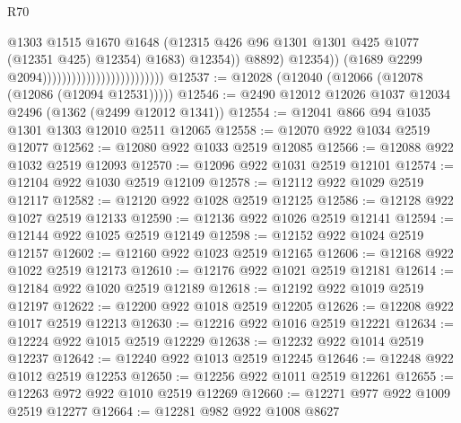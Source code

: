 \begin{lexlean}{R70}
\begin{coremodule}
                                                                @1303
                                                                @1515
                                                                @1670
                                                                @1648
                                                                (@12315
                                                                  @426
                                                                  @96
                                                                  @1301
                                                                  @1301
                                                                  @425
                                                                  @1077
                                                                  (@12351 @425)
                                                                  @12354)
                                                                @1683)
                                                              @12354))
                                                          @8892)
                                                        @12354))
                                                    (@1689 @2299 @2094)))))))))))))))))))))))))
@12537 := @12028 (@12040 (@12066 (@12078 (@12086 (@12094 @12531)))))
@12546 := @2490 @12012 @12026 @1037 @12034 @2496 (@1362 (@2499 @12012 @1341))
@12554 := @12041 @866 @94 @1035 @1301 @1303 @12010 @2511 @12065
@12558 := @12070 @922 @1034 @2519 @12077
@12562 := @12080 @922 @1033 @2519 @12085
@12566 := @12088 @922 @1032 @2519 @12093
@12570 := @12096 @922 @1031 @2519 @12101
@12574 := @12104 @922 @1030 @2519 @12109
@12578 := @12112 @922 @1029 @2519 @12117
@12582 := @12120 @922 @1028 @2519 @12125
@12586 := @12128 @922 @1027 @2519 @12133
@12590 := @12136 @922 @1026 @2519 @12141
@12594 := @12144 @922 @1025 @2519 @12149
@12598 := @12152 @922 @1024 @2519 @12157
@12602 := @12160 @922 @1023 @2519 @12165
@12606 := @12168 @922 @1022 @2519 @12173
@12610 := @12176 @922 @1021 @2519 @12181
@12614 := @12184 @922 @1020 @2519 @12189
@12618 := @12192 @922 @1019 @2519 @12197
@12622 := @12200 @922 @1018 @2519 @12205
@12626 := @12208 @922 @1017 @2519 @12213
@12630 := @12216 @922 @1016 @2519 @12221
@12634 := @12224 @922 @1015 @2519 @12229
@12638 := @12232 @922 @1014 @2519 @12237
@12642 := @12240 @922 @1013 @2519 @12245
@12646 := @12248 @922 @1012 @2519 @12253
@12650 := @12256 @922 @1011 @2519 @12261
@12655 := @12263 @972 @922 @1010 @2519 @12269
@12660 := @12271 @977 @922 @1009 @2519 @12277
@12664 := @12281 @982 @922 @1008 @8627

\end{coremodule}
\end{lexlean}
